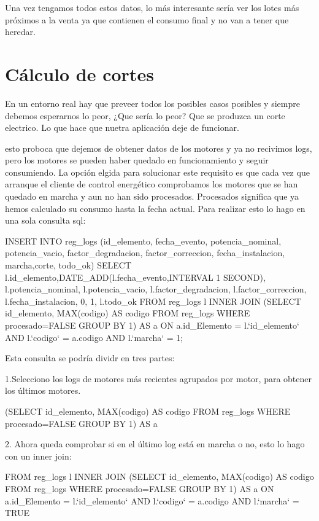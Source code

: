 Una vez tengamos todos estos datos, lo más interesante sería ver los lotes más próximos a la venta ya 
que contienen el consumo final y no van a tener que heredar.

\section*{Cálculo de cortes}

En un entorno real hay que preveer todos los posibles casos posibles y siempre debemos esperarnos lo peor,
¿Que sería lo peor? Que se produzca un corte electrico. Lo que hace que nuetra aplicación deje de funcionar.

esto proboca que dejemos de obtener datos de los motores y ya no recivimos logs, pero los motores se pueden
haber quedado en funcionamiento y seguir consumiendo. La opción elgida para solucionar este requisito es
que cada vez que arranque el cliente de control energético comprobamos los motores que se han quedado en
marcha y aun no han sido procesados. Procesados significa que ya hemos calculado su consumo hasta la fecha
actual. Para realizar esto lo hago en una sola consulta sql:

INSERT INTO reg_logs (id_elemento, fecha_evento, potencia_nominal, potencia_vacio, factor_degradacion, factor_correccion, fecha_instalacion, marcha,corte, todo_ok) 
        SELECT l.id_elemento,DATE_ADD(l.fecha_evento,INTERVAL 1 SECOND), l.potencia_nominal, l.potencia_vacio, l.factor_degradacion,
        l.factor_correccion, l.fecha_instalacion, 0, 1, l.todo_ok  
        FROM reg_logs l INNER JOIN  
        (SELECT id_elemento, MAX(codigo) AS codigo FROM reg_logs WHERE procesado=FALSE GROUP BY 1) AS a  
        ON a.id_Elemento = l.`id_elemento` AND l.`codigo` = a.codigo AND l.`marcha` = 1;


Esta consulta se podría dividr en tres partes:

1.Selecciono los logs de motores más recientes agrupados por motor, para obtener los últimos motores.

 (SELECT id_elemento, MAX(codigo) AS codigo FROM reg_logs WHERE procesado=FALSE GROUP BY 1) AS a 

2. Ahora queda comprobar si en el último log está en marcha o no, esto lo hago con un inner join:

FROM reg_logs l INNER JOIN 
       		 (SELECT id_elemento, MAX(codigo) AS codigo FROM reg_logs WHERE procesado=FALSE GROUP BY 1) AS a 
       		 ON a.id_Elemento = l.`id_elemento` AND l.`codigo` = a.codigo AND l.`marcha` = TRUE

